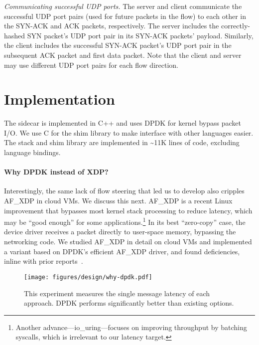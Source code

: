 \textit{Communicating successful UDP ports.}
The server and client communicate the successful UDP port pairs (used for future packets in the flow) to each other in the SYN-ACK and ACK packets, respectively.
The server includes the correctly-hashed SYN packet's UDP port pair in its SYN-ACK packets' payload.
Similarly, the client includes the successful SYN-ACK packet's UDP port pair in the subsequent ACK packet and first data packet.
Note that the client and server may use different UDP port pairs for each flow direction.


\section{Implementation}
\label{sec:implementation}
The \mt{} sidecar is implemented in C++ and uses DPDK for kernel bypass packet I/O.
We use C for the shim library to make interface with other languages easier.
The stack and shim library are implemented in \textasciitilde11K lines of code, excluding language bindings.

\paragraph{Why DPDK instead of XDP?}
\label{par:dpdk-xdp}

Interestingly, the same lack of flow steering that led us to develop \rssminus{} also cripples AF\_XDP in cloud VMs.
We discuss this next.
AF\_XDP is a recent Linux improvement that bypasses most kernel stack processing to reduce latency, which may be ``good enough'' for some applications.\footnote{
Another advance---io\_uring---focuses on improving throughput by batching syscalls, which is irrelevant to our latency target.}
In its best ``zero-copy'' case, the device driver receives a packet directly to user-space memory, bypassing the networking code.
We studied AF\_XDP in detail on cloud VMs and implemented a \mt{} variant based on DPDK's efficient AF\_XDP driver, and found deficiencies, inline with prior reports~\cite{karlsson2018path}.

\begin{figure}[t!]
    \centering
    \texttt{[image: figures/design/why-dpdk.pdf]}
    \vspace{-0.3in}
    \caption{This experiment measures the single message latency of each approach.
    DPDK performs significantly better than existing options.}
    \label{fig:afxdp-single-message-latency}
    \vspace{-0.1in}
\end{figure}

